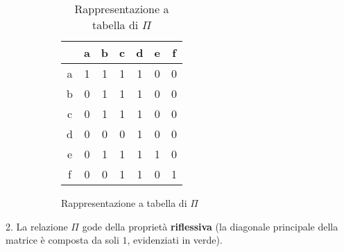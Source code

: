 \documentclass[\main/main.tex]{subfiles}
\begin{document}
\begin{figure}
  \begin{subfigure}{0.49\textwidth}
    \begin{table}
      \begin{tabular}{|c|c|c|c|c|c|c|}
        \hline
          & a                      & b                      & c                      & d                      & e                      & f                      \\
        \hline
        a & \cellcolor{green!25} 1 & 1                      & 1                      & 1                      & 0                      & 0                      \\
        \hline
        b & 0                      & \cellcolor{green!25} 1 & 1                      & 1                      & 0                      & 0                      \\
        \hline
        c & 0                      & 1                      & \cellcolor{green!25} 1 & 1                      & 0                      & 0                      \\
        \hline
        d & 0                      & 0                      & 0                      & \cellcolor{green!25} 1 & 0                      & 0                      \\
        \hline
        e & 0                      & 1                      & 1                      & 1                      & \cellcolor{green!25} 1 & 0                      \\
        \hline
        f & 0                      & 0                      & 1                      & 1                      & 0                      & \cellcolor{green!25} 1 \\
        \hline
      \end{tabular}
      \caption{Rappresentazione a tabella di $\Pi$}
    \end{table}
  \end{subfigure}
  \begin{subfigure}{0.49\textwidth}
    \ReflexivePreferenceRelationship{}
  \end{subfigure}
\end{figure}

2. La relazione $\Pi$ gode della proprietà \textbf{riflessiva} (la diagonale principale della matrice è composta da soli $1$, evidenziati in verde).
\end{document}
